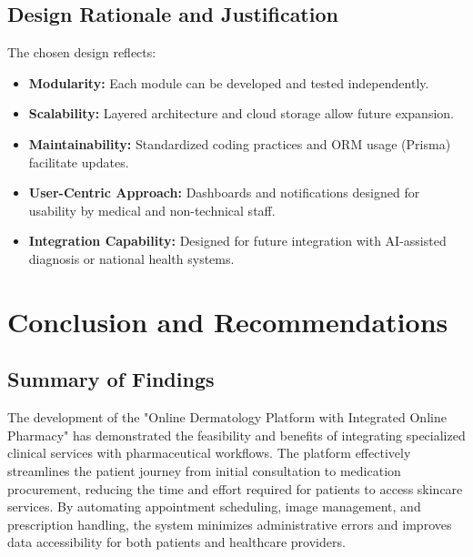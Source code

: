 \documentclass[12pt,a4paper]{report}
\begin{document}
\section{Design Rationale and Justification}
The chosen design reflects:
\begin{itemize}
    \item \textbf{Modularity:} Each module can be developed and tested independently.
    \item \textbf{Scalability:} Layered architecture and cloud storage allow future expansion.
    \item \textbf{Maintainability:} Standardized coding practices and ORM usage (Prisma) facilitate updates.
    \item \textbf{User-Centric Approach:} Dashboards and notifications designed for usability by medical and non-technical staff.
    \item \textbf{Integration Capability:} Designed for future integration with AI-assisted diagnosis or national health systems.
\end{itemize}


\chapter{Conclusion and Recommendations}

\section{Summary of Findings}
The development of the "Online Dermatology Platform with Integrated Online Pharmacy" has demonstrated the feasibility and benefits of integrating specialized clinical services with pharmaceutical workflows. The platform effectively streamlines the patient journey from initial consultation to medication procurement, reducing the time and effort required for patients to access skincare services. By automating appointment scheduling, image management, and prescription handling, the system minimizes administrative errors and improves data accessibility for both patients and healthcare providers.
\end{document}
